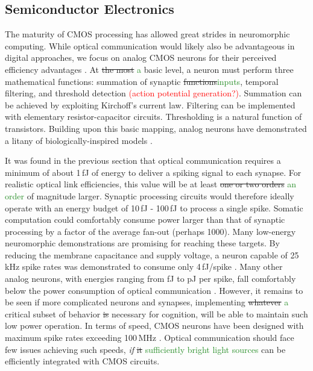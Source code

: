 \documentclass[twocolumn]{article}
\begin{document}
\subsection{Semiconductor Electronics}
The maturity of CMOS processing has allowed great strides in neuromorphic computing. While optical communication would likely also be advantageous in digital approaches, we focus on analog CMOS neurons for their perceived efficiency advantages \cite{mead1990neuromorphic,rajendran2012specifications}. At \sout{the most} \textcolor{ForestGreen}{a} basic level, a neuron must perform three mathematical functions: summation of synaptic \sout{functions}\textcolor{ForestGreen}{inputs}, temporal filtering, and threshold detection \textcolor{red}{(action potential generation?)}. Summation can be achieved by exploiting Kirchoff's current law. Filtering can be implemented with elementary resistor-capacitor circuits. Thresholding is a natural function of transistors. Building upon this basic mapping, analog neurons have demonstrated a litany of biologically-inspired models \cite{indiveri2011neuromorphic,lide2015}.

It was found in the previous section that optical communication requires a minimum of about 1\,fJ of energy to deliver a spiking signal to each synapse. For realistic optical link efficiencies, this value will be at least \sout{one or two orders} \textcolor{ForestGreen}{an order} of magnitude larger. Synaptic processing circuits would therefore ideally operate with an energy budget of 10\,fJ - 100\,fJ to process a single spike. Somatic computation could comfortably consume power larger than that of synaptic processing by a factor of the average fan-out (perhaps 1000). Many low-energy neuromorphic demonstrations are promising for reaching these targets. By reducing the membrane capacitance and supply voltage, a neuron capable of 25\,kHz spike rates was demonstrated to consume only 4\,fJ/spike \cite{sourikopoulos20174}. Many other analog neurons, with energies ranging from fJ to pJ per spike, fall comfortably below the power consumption of optical communication \cite{indiveri2019importance}. However, it remains to be seen if more complicated neurons and synapses, implementing \sout{whatever} \textcolor{ForestGreen}{a} critical subset of behavior \sout{is} necessary for cognition, will be able to maintain such low power operation. In terms of speed, CMOS neurons have been designed with maximum spike rates exceeding 100\,MHz \cite{need_this_one_from_Bryce}.  Optical communication should face few issues achieving such speeds, \textit{if} \sout{it} \textcolor{ForestGreen}{sufficiently bright light sources} can be efficiently integrated with CMOS circuits.
\end{document}
